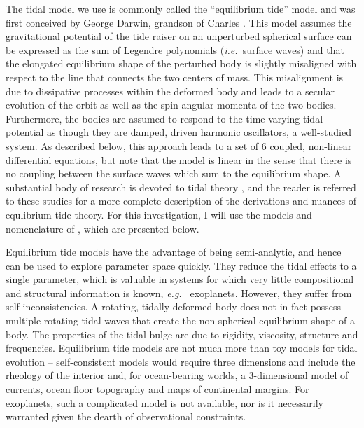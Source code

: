 \documentclass[preprint,12pt]{aastex}
\def\eg{{\it e.g.\ }}
\def\ie{{\it i.e.\ }}
\begin{document}
The tidal model we use is commonly called the ``equilibrium tide''
model and was first conceived by George Darwin, grandson of Charles
\citep{Darwin1880}. This model assumes the gravitational potential of
the tide raiser on an unperturbed spherical surface can be expressed
as the sum of Legendre polynomials (\ie surface waves) and that the
elongated equilibrium shape of the perturbed body is slightly
misaligned with respect to the line that connects the two centers of
mass. This misalignment is due to dissipative processes within the
deformed body and leads to a secular evolution of the orbit as well as
the spin angular momenta of the two bodies. Furthermore, the bodies
are assumed to respond to the time-varying tidal potential as though
they are damped, driven harmonic oscillators, a well-studied
system. As described below, this approach leads to a set of 6 coupled,
non-linear differential equations, but note that the model is linear
in the sense that there is no coupling between the surface waves which
sum to the equilibrium shape. A substantial body of research is
devoted to tidal theory
\cite[\eg][]{Darwin1880,GoldreichSoter66,Hut81,FerrazMello08,Wisdom08,EfroimskyWilliams09,Leconte10}, and the reader is
referred to these studies for a more complete description of the
derivations and nuances of equlibrium tide theory. For this investigation, I
will use the models and nomenclature of \cite{Heller11}, which are
presented below.

Equilibrium tide models have the advantage of being semi-analytic, and hence can be
used to explore parameter space quickly. They reduce the tidal effects
to a single parameter, which is valuable in systems for which very
little compositional and structural information is known, \eg
exoplanets. However, they suffer from self-inconsistencies. A
rotating, tidally deformed body does not in fact possess multiple
rotating tidal waves that create the non-spherical equilibrium shape
of a body. The properties of the tidal bulge are due to rigidity,
viscosity, structure and frequencies. Equilibrium tide models are not much more than
toy models for tidal evolution -- self-consistent models would require
three dimensions and include the rheology of the interior and, for
ocean-bearing worlds, a 3-dimensional model of currents, ocean floor
topography and maps of continental margins. For exoplanets, such a
complicated model is not available, nor is it necessarily warranted
given the dearth of observational constraints.
\end{document}
